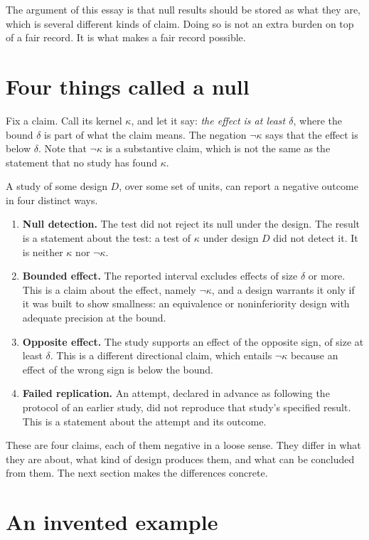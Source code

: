 \documentclass[11pt]{article}
\newcommand{\nk}[1]{\neg #1}
\begin{document}
The argument of this essay is that null results should be stored as what they are, which is several different kinds of claim. Doing so is not an extra burden on top of a fair record. It is what makes a fair record possible.

\section{Four things called a null}\label{sec:four}

Fix a claim. Call its kernel $\kappa$, and let it say: \emph{the effect is at least $\delta$}, where the bound $\delta$ is part of what the claim means. The negation $\nk\kappa$ says that the effect is below $\delta$. Note that $\nk\kappa$ is a substantive claim, which is not the same as the statement that no study has found $\kappa$.

A study of some design $D$, over some set of units, can report a negative outcome in four distinct ways.

\begin{enumerate}[label=(\roman*)]
\item \textbf{Null detection.} The test did not reject its null under the design. The result is a statement about the test: a test of $\kappa$ under design $D$ did not detect it. It is neither $\kappa$ nor $\nk\kappa$.
\item \textbf{Bounded effect.} The reported interval excludes effects of size $\delta$ or more. This is a claim about the effect, namely $\nk\kappa$, and a design warrants it only if it was built to show smallness: an equivalence or noninferiority design with adequate precision at the bound.
\item \textbf{Opposite effect.} The study supports an effect of the opposite sign, of size at least $\delta$. This is a different directional claim, which entails $\nk\kappa$ because an effect of the wrong sign is below the bound.
\item \textbf{Failed replication.} An attempt, declared in advance as following the protocol of an earlier study, did not reproduce that study's specified result. This is a statement about the attempt and its outcome.
\end{enumerate}

These are four claims, each of them negative in a loose sense. They differ in what they are about, what kind of design produces them, and what can be concluded from them. The next section makes the differences concrete.

\section{An invented example}\label{sec:example}
\end{document}

